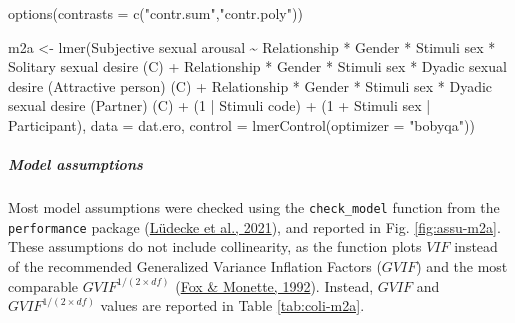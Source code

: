 \documentclass[
  bookmarksnumbered]{article}
\newenvironment{Shaded}{\begin{snugshade}}{\end{snugshade}}
\newcommand{\AttributeTok}[1]{\textcolor[rgb]{0.80,0.80,0.80}{#1}}
\newcommand{\DecValTok}[1]{\textcolor[rgb]{0.86,0.86,0.80}{#1}}
\newcommand{\FunctionTok}[1]{\textcolor[rgb]{0.94,0.94,0.56}{#1}}
\newcommand{\NormalTok}[1]{\textcolor[rgb]{0.80,0.80,0.80}{#1}}
\newcommand{\OtherTok}[1]{\textcolor[rgb]{0.94,0.94,0.56}{#1}}
\newcommand{\SpecialCharTok}[1]{\textcolor[rgb]{0.86,0.64,0.64}{#1}}
\newcommand{\StringTok}[1]{\textcolor[rgb]{0.80,0.58,0.58}{#1}}
\begin{document}
\begin{Shaded}
\begin{Highlighting}[]
\FunctionTok{options}\NormalTok{(}\AttributeTok{contrasts =} \FunctionTok{c}\NormalTok{(}\StringTok{"contr.sum"}\NormalTok{,}\StringTok{"contr.poly"}\NormalTok{))}

\NormalTok{m2a }\OtherTok{\textless{}{-}} \FunctionTok{lmer}\NormalTok{(}\StringTok{\textasciigrave{}}\AttributeTok{Subjective sexual arousal}\StringTok{\textasciigrave{}} \SpecialCharTok{\textasciitilde{}}
\NormalTok{            Relationship }\SpecialCharTok{*}\NormalTok{ Gender }\SpecialCharTok{*} \StringTok{\textasciigrave{}}\AttributeTok{Stimuli sex}\StringTok{\textasciigrave{}} \SpecialCharTok{*} \StringTok{\textasciigrave{}}\AttributeTok{Solitary sexual desire (C)}\StringTok{\textasciigrave{}} \SpecialCharTok{+}
\NormalTok{            Relationship }\SpecialCharTok{*}\NormalTok{ Gender }\SpecialCharTok{*} \StringTok{\textasciigrave{}}\AttributeTok{Stimuli sex}\StringTok{\textasciigrave{}} \SpecialCharTok{*} \StringTok{\textasciigrave{}}\AttributeTok{Dyadic sexual desire (Attractive person) (C)}\StringTok{\textasciigrave{}} \SpecialCharTok{+}
\NormalTok{            Relationship }\SpecialCharTok{*}\NormalTok{ Gender }\SpecialCharTok{*} \StringTok{\textasciigrave{}}\AttributeTok{Stimuli sex}\StringTok{\textasciigrave{}} \SpecialCharTok{*} \StringTok{\textasciigrave{}}\AttributeTok{Dyadic sexual desire (Partner) (C)}\StringTok{\textasciigrave{}} \SpecialCharTok{+}
\NormalTok{            (}\DecValTok{1} \SpecialCharTok{|} \StringTok{\textasciigrave{}}\AttributeTok{Stimuli code}\StringTok{\textasciigrave{}}\NormalTok{) }\SpecialCharTok{+}
\NormalTok{            (}\DecValTok{1} \SpecialCharTok{+} \StringTok{\textasciigrave{}}\AttributeTok{Stimuli sex}\StringTok{\textasciigrave{}} \SpecialCharTok{|}\NormalTok{ Participant),}
           \AttributeTok{data =}\NormalTok{ dat.ero,}
           \AttributeTok{control =} \FunctionTok{lmerControl}\NormalTok{(}\AttributeTok{optimizer =} \StringTok{"bobyqa"}\NormalTok{))}
\end{Highlighting}
\end{Shaded}

\hypertarget{model-assumptions-1}{%
\subparagraph{Model assumptions}\label{model-assumptions-1}}

Most model assumptions were checked using the \texttt{check\_model} function from the \texttt{performance} package (\protect\hyperlink{ref-ludecke2021}{Lüdecke et al., 2021}), and reported in Fig. \ref{fig:assu-m2a}. These assumptions do not include collinearity, as the function plots \(VIF\) instead of the recommended Generalized Variance Inflation Factors (\(GVIF\)) and the most comparable \(GVIF^{{1}/{(2 \times df)}}\) (\protect\hyperlink{ref-fox1992}{Fox \& Monette, 1992}). Instead, \(GVIF\) and \(GVIF^{{1}/{(2 \times df)}}\) values are reported in Table \ref{tab:coli-m2a}.
\end{document}
